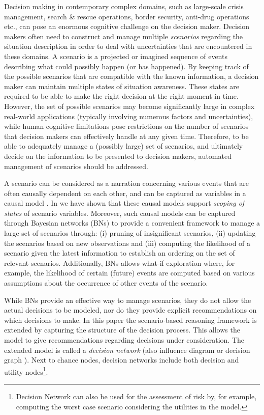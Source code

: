\documentclass[conference]{IEEEtran}
\begin{document}
Decision making in contemporary complex domains, such as large-scale crisis management, search \& rescue operations, border security, anti-drug operations etc., can pose an enormous cognitive challenge on the decision maker. Decision makers often need to construct and manage multiple {\em scenarios} regarding the situation description in order to deal with uncertainties that are encountered in these domains. A scenario is a projected or imagined sequence of events describing what could possibly happen (or has happened). By keeping track of the possible scenarios that are compatible with the known information, a decision maker can maintain multiple states of situation awareness. These states are required to be able to make the right decision at the right moment in time. However, the set of possible scenarios may become significantly large in complex real-world applications (typically involving numerous factors and uncertainties), while human cognitive limitations pose restrictions on the number of scenarios that decision makers can effectively handle at any given time. Therefore, to be able to adequately manage a (possibly large) set of scenarios, and  ultimately decide on the information to be presented to decision makers, automated management of scenarios should be addressed.

A scenario can be considered as a narration concerning various events that are often causally dependent on each other, and can be captured as variables in a causal model \cite{pearl00book}. In \cite{conrado14if} we have shown that these causal models support {\em scoping of states} of scenario variables. Moreover, such causal models can be captured through Bayesian networks (BNs) \cite{pearl88book, jensen07book} to provide a convenient framework to manage a large set of scenarios through: (i) pruning of insignificant scenarios, (ii) updating the scenarios based on new observations and (iii) computing the likelihood of a scenario given the latest information to establish an ordering on the set of relevant scenarios. Additionally, BNs allows what-if exploration where, for example, the likelihood of certain (future) events are computed based on various assumptions about the occurrence of other events of the scenario.

While BNs provide an effective way to manage scenarios, they do not allow the actual decisions to be modeled, nor do they provide explicit recommendations on which decisions to make. In this paper the scenario-based reasoning framework is extended by capturing the structure of the decision process. This allows the model to give recommendations regarding decisions under consideration. The extended model is called a {\em decision network} \cite{russell02bn} (also influence diagram or decision graph \cite{jensen07book}). Next to chance nodes, decision networks include both decision and utility nodes\footnote{Decision Network can also be used for the assessment of risk by, for example, computing the worst case scenario considering the utilities in the model.}.
\end{document}
